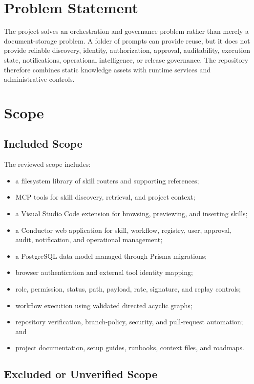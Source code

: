 \documentclass[12pt]{report}
\begin{document}
\section{Problem Statement}

The project solves an orchestration and governance problem rather than merely a document-storage problem. A folder of prompts can provide reuse, but it does not provide reliable discovery, identity, authorization, approval, auditability, execution state, notifications, operational intelligence, or release governance. The repository therefore combines static knowledge assets with runtime services and administrative controls.

\section{Scope}

\subsection{Included Scope}

The reviewed scope includes:

\begin{itemize}
  \item a filesystem library of skill routers and supporting references;
  \item MCP tools for skill discovery, retrieval, and project context;
  \item a Visual Studio Code extension for browsing, previewing, and inserting skills;
  \item a Conductor web application for skill, workflow, registry, user, approval, audit, notification, and operational management;
  \item a PostgreSQL data model managed through Prisma migrations;
  \item browser authentication and external tool identity mapping;
  \item role, permission, status, path, payload, rate, signature, and replay controls;
  \item workflow execution using validated directed acyclic graphs;
  \item repository verification, branch-policy, security, and pull-request automation; and
  \item project documentation, setup guides, runbooks, context files, and roadmaps.
\end{itemize}

\subsection{Excluded or Unverified Scope}
\end{document}
